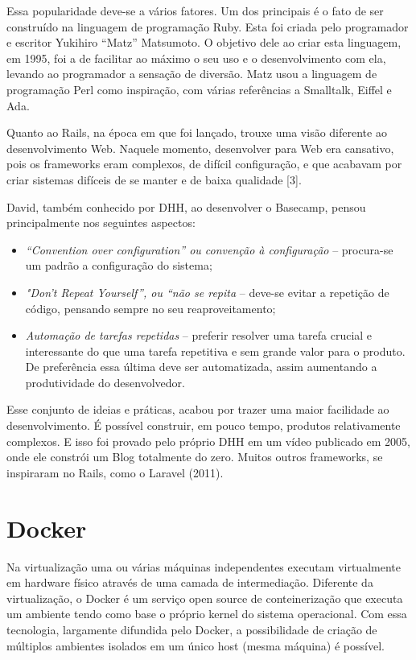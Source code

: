 Essa popularidade deve-se a vários fatores. Um dos principais é o fato de ser construído na linguagem de programação Ruby. Esta foi criada pelo programador e escritor Yukihiro “Matz” Matsumoto. O objetivo dele ao criar esta linguagem, em 1995, foi a de facilitar ao máximo o seu uso e o desenvolvimento com ela, levando ao programador a sensação de diversão. Matz usou a linguagem de programação Perl como inspiração, com várias referências a Smalltalk, Eiffel e Ada.

Quanto ao Rails, na época em que foi lançado, trouxe uma visão diferente ao desenvolvimento Web. Naquele momento, desenvolver para Web era cansativo, pois os frameworks eram complexos, de difícil configuração, e que acabavam por criar sistemas difíceis de se manter e de baixa qualidade [3].

David, também conhecido por DHH, ao desenvolver o Basecamp, pensou principalmente nos seguintes aspectos:

\begin{itemize}
   \item \textit{“Convention over configuration” ou convenção à configuração} -- procura-se um padrão a configuração do sistema;
   \item \textit{"Don’t Repeat Yourself”, ou “não se repita} -- deve-se evitar a repetição de código, pensando sempre no seu reaproveitamento;
   \item \textit{Automação de tarefas repetidas} -- preferir resolver uma tarefa crucial e interessante do que uma tarefa repetitiva e sem grande valor para o produto. De preferência essa última deve ser automatizada, assim aumentando a produtividade do desenvolvedor.
\end{itemize}

Esse conjunto de ideias e práticas, acabou por trazer uma maior facilidade ao desenvolvimento. É possível construir, em pouco tempo, produtos relativamente complexos. E isso foi provado pelo próprio DHH em um vídeo publicado em 2005, onde ele constrói um Blog totalmente do zero. Muitos outros frameworks, se inspiraram no Rails, como o Laravel (2011).

\section{Docker}

Na virtualização uma ou várias máquinas independentes executam virtualmente em hardware físico através de uma camada de intermediação. Diferente da virtualização, o Docker é um serviço open source de conteinerização que executa um ambiente tendo como base o próprio kernel do sistema operacional. Com essa tecnologia, largamente difundida pelo Docker, a possibilidade de criação de múltiplos ambientes isolados em um único host (mesma máquina) é possível.

